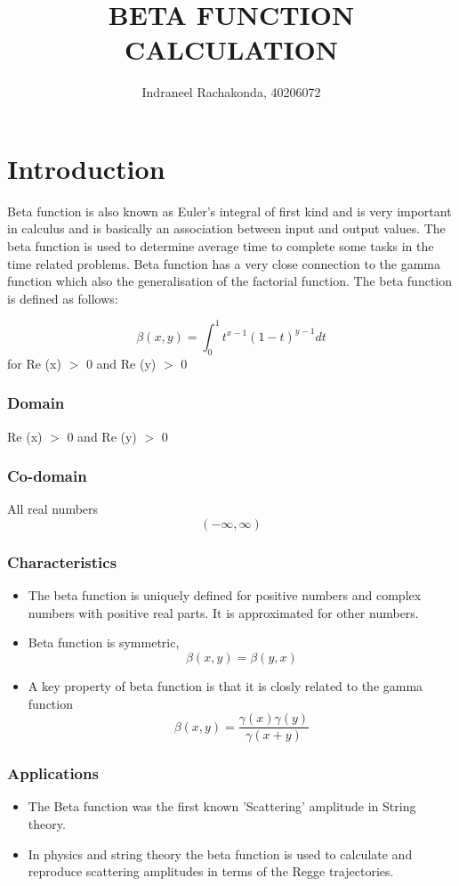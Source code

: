 \documentclass[10pt]{article}
\title{BETA FUNCTION CALCULATION}
\author{Indraneel Rachakonda, 40206072}
\date{}
\begin{document}
\maketitle

\section*{Introduction}
Beta function is also known as Euler's integral of first kind and is very important in calculus and is basically an association between input and output values. The beta function is used to determine average time to complete some tasks in the time related problems. Beta function has a very close connection to the gamma function which also the generalisation of the factorial function. The beta function is defined as follows: 


    $$\beta(x,y) =\int_{0}^{1} t^{x-1} (1-t)^{y-1} dt$$
    for Re (x) $>$ 0 and Re (y) $>$ 0
    
\subsubsection*{Domain}
Re (x) $>$ 0 and Re (y) $>$ 0

\subsubsection*{Co-domain}
All real numbers \[ (-\infty,\infty )\]

\subsubsection*{Characteristics}
\begin{itemize}
    \item The beta function is uniquely defined for positive numbers and complex numbers with positive real parts. It is approximated for other numbers.
    \item Beta function is symmetric,$$ \beta(x,y) = \beta(y,x)$$
    \item A key property of beta function is that it is closly related to the gamma function
    $$\beta(x,y) = \frac{\gamma(x)\gamma(y)}{\gamma(x+y)}$$
\end{itemize}

\subsubsection*{Applications}
\begin{itemize}
    \item The Beta function was the first known 'Scattering' amplitude in String theory.
    \item In physics and string theory the beta function is used to calculate and reproduce scattering amplitudes in terms of the Regge trajectories.
\end{itemize}
\end{document}
